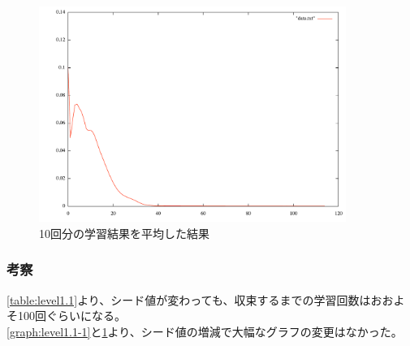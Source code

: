\begin{figure}[h]
 \begin{center}
  \includegraphics[width=10.0cm]{figs/ex_ave.pdf}
  \caption{10回分の学習結果を平均した結果}
  \label{graph:level1.1-2}
 \end{center}
\end{figure}

\subsubsection{考察}
\ref{table:level1.1}より、シード値が変わっても、収束するまでの学習回数はおおよそ100回ぐらいになる。\\
\ref{graph:level1.1-1}と\ref{graph:level1.1-2}より、シード値の増減で大幅なグラフの変更はなかった。
